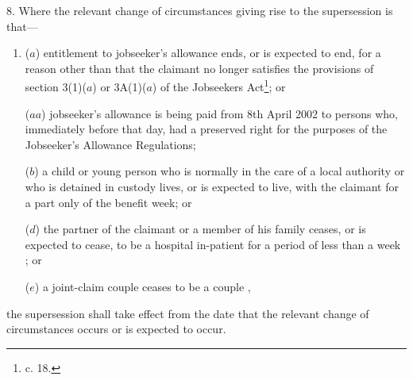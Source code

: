 \documentclass[12pt,a4paper]{article}
\begin{document}
\medskip

8.  Where the relevant change of circumstances giving rise to the supersession is that—
\begin{enumerate}\item[]
($a$) entitlement to jobseeker’s allowance ends, or is expected to end, for a reason other than that the claimant no longer satisfies the provisions of section 3(1)($a$)  
or 3A(1)($a$)   %
of the Jobseekers Act\footnote{ c. 18.}; or

($aa$) jobseeker’s allowance is being paid from 8th April 2002 to persons who, immediately before that day, had a preserved right for the purposes of the Jobseeker’s Allowance Regulations;

($b$) a child or young person who is normally in the care of a local authority or who is detained in custody lives, or is expected to live, with the claimant for a part only of the benefit week; or


($d$) the partner of the claimant or a member of his family ceases, or is expected to cease, to be a hospital in-patient for a period of less than a week%
; or

    ($e$) 
    a joint-claim couple ceases to be 
a couple%
,
\end{enumerate}
the supersession shall take effect from the date that the relevant change of circumstances occurs or is expected to occur.

\end{document}
